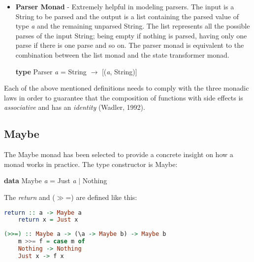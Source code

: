\documentclass[a4paper, onecolumn]{article}
\begin{document}
\begin{itemize}
    \begin{center}
        \textbf{type} ST \textit{s a} = \textit{s} $\rightarrow$ (\textit{a}, \textit{s})
    \end{center}
    \item \textbf{Parser Monad} - Extremely helpful in modeling parsers. The input is a String to be parsed and the output is a list containing the parsed value of type \textit{a} and the remaining unparsed String. The list represents all the possible parses of the input String; being empty if nothing is parsed, having only one parse if there is one parse and so on. The parser monad is equivalent to the combination between the list monad and the state transformer monad.  
    \begin{center}
        \textbf{type} Parser \textit{a} = String $\rightarrow$ [(\textit{a}, String)] 
    \end{center}
\end{itemize}
Each of the above mentioned definitions needs to comply with the three monadic laws in order to guarantee that the composition of functions with side effects is \textit{associative} and has an \textit{identity} (Wadler, 1992).

\subsection{Maybe}
The Maybe monad has been selected to provide a concrete insight on how a monad works in practice. The type constructor is Maybe:

\begin{center}
    \textbf{data} Maybe \textit{a} = Just \textit{a} $\vert$ Nothing 
\end{center}
The \textit{return} and ($\gg$=) are defined like this:

\begin{lstlisting}[language=Haskell]
    return :: a -> Maybe a
    return x = Just x 
\end{lstlisting}

\begin{lstlisting}[language=Haskell]
    (>>=) :: Maybe a -> (\a -> Maybe b) -> Maybe b
    m >>= f = case m of 
    Nothing -> Nothing
    Just x -> f x
\end{lstlisting}
\end{document}

